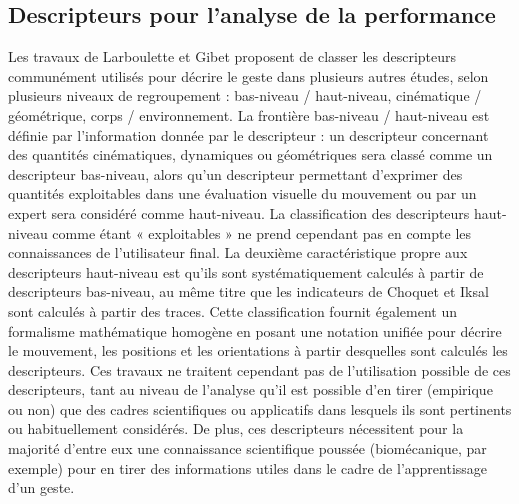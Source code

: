\subsection{Descripteurs pour l'analyse de la performance}
Les travaux de Larboulette et Gibet \parencite{larboulette2015Descriptors} proposent de classer les descripteurs communément utilisés pour décrire le geste dans plusieurs autres études, selon plusieurs niveaux de regroupement : bas-niveau / haut-niveau, cinématique / géométrique, corps / environnement. La frontière bas-niveau / haut-niveau est définie par l'information donnée par le descripteur : un descripteur concernant des quantités cinématiques, dynamiques ou géométriques sera classé comme un descripteur bas-niveau, alors qu'un descripteur permettant d'exprimer des quantités exploitables dans une évaluation visuelle du mouvement ou par un expert sera considéré comme haut-niveau. La classification des descripteurs haut-niveau comme étant « exploitables » ne prend cependant pas en compte les connaissances de l'utilisateur final. La deuxième caractéristique propre aux descripteurs haut-niveau est qu'ils sont systématiquement calculés à partir de descripteurs bas-niveau, au même titre que les indicateurs de Choquet et Iksal sont calculés à partir des traces. Cette classification fournit également un formalisme mathématique homogène en posant une notation unifiée pour décrire le mouvement, les positions et les orientations à partir desquelles sont calculés les descripteurs. Ces travaux ne traitent cependant pas de l'utilisation possible de ces descripteurs, tant au niveau de l'analyse qu'il est possible d'en tirer (empirique ou non) que des cadres scientifiques ou applicatifs dans lesquels ils sont pertinents ou habituellement considérés. De plus, ces descripteurs nécessitent pour la majorité d'entre eux une connaissance scientifique poussée (biomécanique, par exemple) pour en tirer des informations utiles dans le cadre de l'apprentissage d'un geste.


